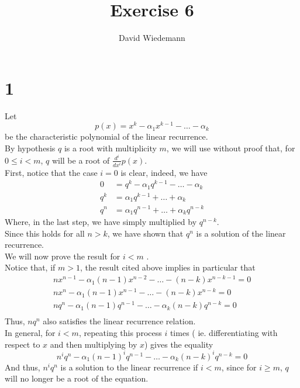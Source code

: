 \documentclass[11pt, a4paper]{article}
\begin{document}
\title{Exercise 6}
\author{David Wiedemann}
\maketitle
\section*{1}
Let 
\[ 
	p( x) = x^{k}- \alpha_1 x^{k-1} - \ldots - \alpha_{k} 
\]
be the characteristic polynomial of the linear recurrence.\\
By hypothesis $q$ is a root with multiplicity $m$, we will use without proof that, for $0\leq i<m$,  $q$ will be a root of $ \frac{d^{i}}{dx^{i}}p( x) $.\\
First, notice that the case $i=0$ is clear, indeed, we have
\begin{align*}
	 0 &=q^{k} - \alpha_1 q^{k-1} - \ldots - \alpha_k \\
	q^{k}&= \alpha_1 q^{k-1} + \ldots + \alpha_k\\
	q^{n} &= \alpha_1 q^{n-1} + \ldots + \alpha_k q^{n-k}
\end{align*}
Where, in the last step, we have simply multiplied by $q^{n-k}$.\\
Since this holds for all $n>k$, we have shown that $q^{n}$ is a solution of the linear recurrence.\\
We will now prove the result for $i<m$ .\\
Notice that, if $m> 1$, the result cited above implies in particular that
\begin{align*}
	n x^{n-1} - \alpha_1( n-1)  x^{n-2} - \ldots - ( n-k) x^{n-k-1} = 0\\
	nx^{n}- \alpha_1( n-1)  x^{n-1} - \ldots - ( n-k) x^{n-k} = 0\\
	n q^{n} - \alpha_1 ( n-1) q^{n-1} - \ldots - \alpha_k( n-k) q^{n-k} = 0\\
\end{align*}
Thus,  $nq^{n}$ also satisfies the linear recurrence relation.\\
In general, for $i<m$, repeating this process $i$ times ( ie. differentiating with respect to $x$ and then multiplying by $x$) gives the equality
\[ 
	n^{i}q^{n} - \alpha_1 ( n-1) ^{i} q^{n-1} - \ldots - \alpha_k ( n-k)^{i}  q^{n-k}=0
\]
And thus, $n^{i}q^{n}$ is a solution to the linear recurrence if $i<m$, since for $i \geq m$, $q$ will no longer be a root of the equation.\\
\end{document}
